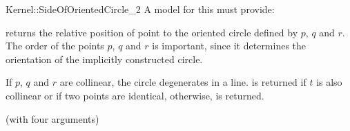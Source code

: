 \begin{ccRefFunctionObjectConcept}{Kernel::SideOfOrientedCircle_2}
A model for this must provide:


         {returns the relative position of point 
          to the oriented circle defined by $p$, $q$ and $r$.
          The order of the points $p$, $q$ and $r$ is important,
          since it determines the orientation of the implicitly
          constructed circle. 

If $p$, $q$ and $r$ are collinear, the circle degenerates in a line.
 is returned if $t$ is also collinear or if two
points are identical, 
otherwise,  is returned.
}

\ccRefines
{} (with four arguments)

\ccSeeAlso
{} \\


\end{ccRefFunctionObjectConcept}
